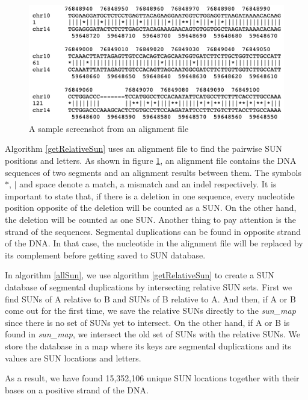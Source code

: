 \begin{figure}[ht]
    \centering
    \includegraphics[scale=0.4]{images/alignmentFile.png}
    \caption{A sample screenshot from an alignment file}
    \label{alignmentFile}
\end{figure}

Algorithm \ref{getRelativeSun} uses an alignment file to find the pairwise SUN positions and letters. As shown in figure \ref{alignmentFile}, an alignment file contains the DNA sequences of two segments and an alignment results between them. The symbols $*$, $|$ and space denote a match, a mismatch and an indel respectively. It is important to state that, if there is a deletion in one sequence, every nucleotide position opposite of the deletion will be counted as a SUN. On the other hand, the deletion will be counted as one SUN. Another thing to pay attention is the strand of the sequences. Segmental duplications can be found in opposite strand of the DNA. In that case, the nucleotide in the alignment file will be replaced by its complement before getting saved to SUN database.

In algorithm \ref{allSun}, we use algorithm \ref{getRelativeSun} to create a SUN database of segmental duplications by intersecting relative SUN sets. First we find SUNs of A relative to B and SUNs of B relative to A. And then, if A or B come out for the first time, we save the relative SUNs directly to the \textit{sun\_map} since there is no set of SUNs yet to intersect. On the other hand, if A or B is found in \textit{sun\_map}, we intersect the old set of SUNs with the relative SUNs. We store the database in a map where its keys are segmental duplications and its values are SUN locations and letters.

As a result, we have found 15,352,106 unique SUN locations together with their bases on a positive strand of the DNA. 

